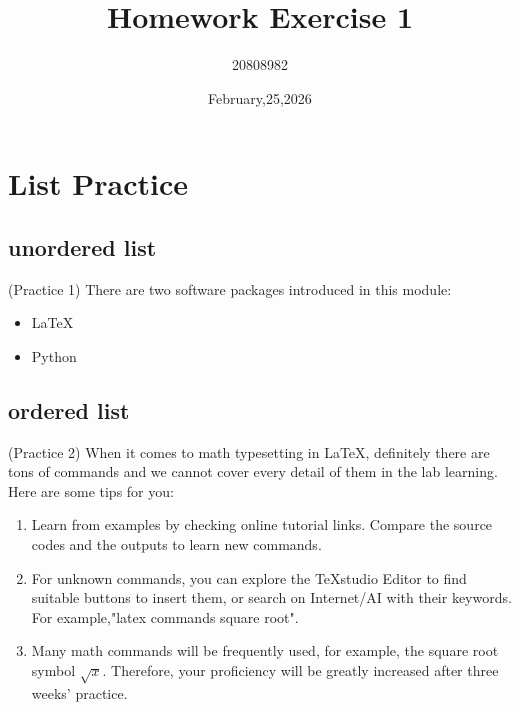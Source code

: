 \documentclass{article}
\title{Homework Exercise 1}
\author{20808982}
\date{February,25,2026}
\begin{document}
	\maketitle
	\tableofcontents
	\newpage
	
	\section{List Practice}
	\subsection{unordered list}
	(Practice 1) There are two software packages introduced in this module:
	\begin{itemize}
		\item \LaTeX{}
		\item Python
	\end{itemize}
	\subsection{ordered list}
	(Practice 2) When it comes to math typesetting in \LaTeX{}, definitely there are tons of commands and we cannot cover every detail of them in the lab learning.\\
	Here are some tips for you:
	\begin{enumerate}
		\item Learn from examples by checking online tutorial links. Compare the source codes and the outputs to learn new commands.
		\item For unknown commands, you can explore the TeXstudio Editor to find suitable buttons to insert them, or search on Internet/AI with their keywords. For example,"latex commands square root".
		\item Many math commands will be frequently used, for example, the square root symbol $\sqrt{x}$. Therefore, your proficiency will be greatly increased after three weeks' practice.
	\end{enumerate}
	
\end{document}
